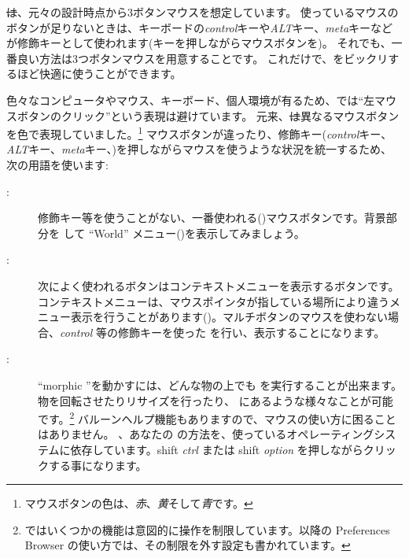\documentclass[a4paper,10pt,twoside]{book}
\begin{document}
\st は、元々の設計時点から3ボタンマウスを想定しています。
使っているマウスのボタンが足りないときは、キーボードの\emph{control}キーや\emph{ALT}キー、\emph{meta}キーなどが修飾キーとして使われます(キーを押しながらマウスボタンを)。
それでも、一番良い方法は3つボタンマウスを用意することです。
これだけで、\pharo をビックリするほど快適に使うことができます。

色々なコンピュータやマウス、キーボード、個人環境が有るため、\pharo では``左マウスボタンのクリック''という表現は避けています。
元来、\st は異なるマウスボタンを色で表現していました。\footnote{マウスボタンの色は、\emph{赤}、\emph{黄}そして\emph{青}です。}
マウスボタンが違ったり、修飾キー(\emph{control}キー、\emph{ALT}キー、\emph{meta}キー、\etc)を押しながらマウスを使うような状況を統一するため、次の用語を使います:

\begin{description}
\item [\click:] 
修飾キー等を使うことがない、一番使われる()マウスボタンです。背景部分を\click{} して ``World'' メニュー()を表示してみましょう。
\item [\actclick:] 
次によく使われるボタンはコンテキストメニューを表示するボタンです。コンテキストメニューは、マウスポインタが指している場所により違うメニュー表示を行うことがあります()。マルチボタンのマウスを使わない場合、\emph{control} 等の修飾キーを使った \actclick を行い、表示することになります。
\item [\metaclick:] 
  ``morphic ''を動かすには、どんな物の上でも \metaclick を実行することが出来ます。物を回転させたりリサイズを行ったり、 にあるような様々なことが可能です。\footnote{\pharo ではいくつかの機能は意図的に操作を制限しています。以降の Preferences Browser の使い方では、その制限を外す設定も書かれています。}
バルーンヘルプ機能もありますので、マウスの使い方に困ることはありません。
、あなたの \metaclick の方法を、使っているオペレーティングシステムに依存しています。{\sc shift} \emph{ctrl} または {\sc shift} \emph{option} を押しながらクリックする事になります。

\end{description}
\end{document}
